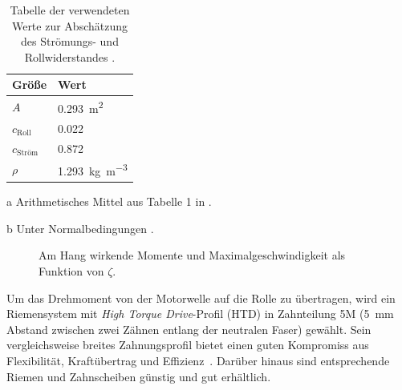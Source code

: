 		\begin{table}[h]
			\caption[Tabelle der verwendeten Werte zur Abschätzung des Strömungs- und Rollwiderstandes]{Tabelle der verwendeten Werte zur Abschätzung des Strömungs- und Rollwiderstandes \cites{GESTIS.Luft}{material.advances.skateboarding.WATERMAN1978}{air.drag.human.body.VANINGENSCHENAU1982}.}%
			\label{tab:drag roll values}
			\centering
			\begin{threeparttable}
				\begin{tabular}{ll}
					\toprule
					Größe\hspace{1cm}								& Wert\\ \midrule
					\(A\)\tnote{a}\hspace{1cm}						& \qty{0,293}{\metre\squared}\\
					\(c_\text{Roll}\)\hspace{1cm}					& \num{0,022}\\
					\(c_\text{Ström}\)\tnote{a}\hspace{1cm}			& \num{0,872}\\
					\(\rho\)\tnote{b}\hspace{1cm}					& \qty{1,293}{\kilo\gram\per\metre\cubed}\\ \bottomrule
				\end{tabular}
				\begin{tablenotes}\footnotesize
					\item[a]	Arithmetisches Mittel aus Tabelle 1 in \cite{air.drag.human.body.VANINGENSCHENAU1982}.
					\item[b]	Unter Normalbedingungen \cite{GESTIS.Luft}.
				\end{tablenotes}
			\end{threeparttable}
		\end{table}
		\begin{figure}[h]
			\centering
			
			\caption[Am Hang wirkende Momente und Maximalgeschwindigkeit als Funktion von \(\zeta\)]{Am Hang wirkende Momente und Maximalgeschwindigkeit als Funktion von \(\zeta\).}%
			\label{fig:torque ratio and vmax vs zetas}
		\end{figure}\par\medskip
		Um das Drehmoment von der Motorwelle auf die Rolle zu übertragen, wird ein Riemensystem mit \textit{High Torque Drive}-Profil (HTD) in Zahnteilung 5M (\qty{5}{mm} Abstand zwischen zwei Zähnen entlang der neutralen Faser) gewählt. 
		Sein vergleichsweise breites Zahnungsprofil bietet einen guten Kompromiss aus Flexibilität, Kraftübertrag und Effizienz~\cite{gates.catalogue.2021}.
		Darüber hinaus sind entsprechende Riemen und Zahnscheiben günstig und gut erhältlich.
		
